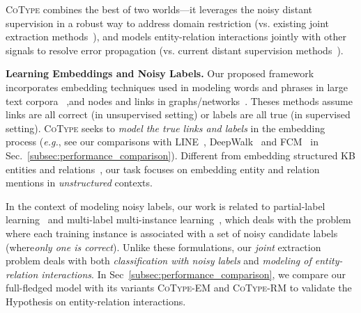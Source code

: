 \documentclass[letterpaper]{sig-alternate-2013}
\def\eg{{\sl e.g.}}
\begin{document}
\textsc{CoType} combines the best of two worlds---it leverages the noisy distant supervision in a robust way to address domain restriction (vs. existing joint extraction methods~\cite{li2014incremental,miwa2014modeling}), and models entity-relation interactions jointly with other signals to resolve error propagation (vs. current distant supervision methods~\cite{surdeanu2012MIME,mintz2009distant}).

\smallskip\noindent
\textbf{\small\textsf{Learning Embeddings and Noisy Labels.}}
Our proposed framework incorporates embedding techniques used in modeling words and phrases in large text corpora~\cite{mikolov2013distributed,Yogatama2015embedding,salehi2015word} ,and nodes and links in graphs/networks~\cite{tang2015line,perozzi2014deepwalk}. Theses methods assume links are all correct (in unsupervised setting) or labels are all true (in supervised setting). \textsc{CoType} seeks to \textit{model the true links and labels} in the embedding process (\eg, see our comparisons with LINE~\cite{tang2015line}, DeepWalk~\cite{perozzi2014deepwalk} and FCM~\cite{gormley2015improved} in Sec.~\ref{subsec:performance_comparison}).
Different from embedding structured KB entities and relations~\cite{bordes2013translating,toutanova2015representing}, our task focuses on embedding entity and relation mentions in \textit{unstructured} contexts.


In the context of modeling noisy labels, our work is related to partial-label learning~\cite{ren2016label,cour2011learning,
nguyen2008classification} and multi-label multi-instance learning~\cite{surdeanu2012MIME}, which deals with the problem where each training instance is associated with a set of noisy candidate labels (where\textit{only one is correct}). Unlike these formulations, our \textit{joint} extraction problem deals with both \textit{classification with noisy labels} and \textit{modeling of entity-relation interactions}. In Sec~\ref{subsec:performance_comparison}, we compare our full-fledged model with its variants \textsc{CoType-EM} and \textsc{CoType-RM} to validate the Hypothesis on entity-relation interactions. 
\end{document}

